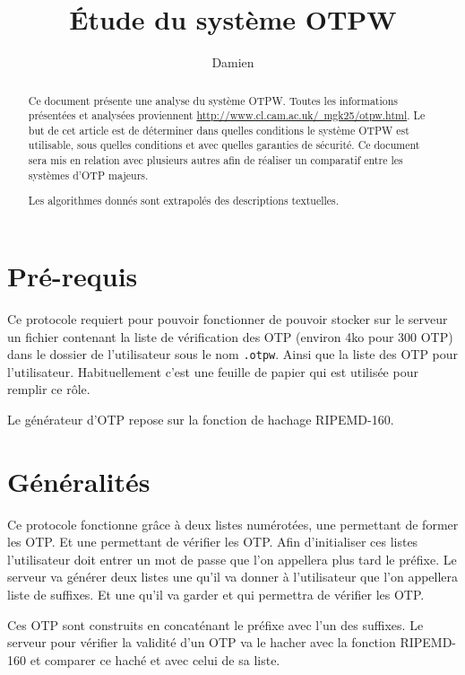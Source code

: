 \documentclass{../res/univ-projet}
\title{\'Etude du syst\`eme OTPW}
\author{Damien \bsc{PICARD}}
\begin{document}
\maketitle

\begin{abstract}
        Ce document présente une analyse du système OTPW. Toutes les
    informations présentées et analysées proviennent 
    \hyperref[de ce site]{http://www.cl.cam.ac.uk/~mgk25/otpw.html}. Le
    but de cet article est de déterminer dans quelles conditions le
    système OTPW est utilisable, sous quelles conditions et avec quelles 
    garanties de sécurité.
    Ce document sera mis en relation avec plusieurs autres afin de réaliser un
    comparatif entre les systèmes d'OTP majeurs.

    Les algorithmes donnés sont extrapolés des descriptions textuelles.
\end{abstract}
\newpage
\tableofcontents
\newpage

\section{Pré-requis}
        Ce protocole requiert pour pouvoir fonctionner de pouvoir stocker
    sur le serveur un fichier contenant la liste de vérification des OTP (environ 
    4ko pour 300 OTP) dans le dossier de l'utilisateur sous le nom \verb?.otpw?.
    Ainsi que la liste des OTP pour l'utilisateur. Habituellement
    c'est une feuille de papier qui est utilisée pour remplir ce rôle.

        Le générateur d'OTP repose sur la fonction de hachage RIPEMD-160.

\section{Généralités}
        Ce protocole fonctionne grâce à deux listes numérotées, une permettant 
    de former les OTP. Et une permettant de vérifier les OTP. Afin d'initialiser
    ces listes l'utilisateur doit entrer un mot de passe que l'on appellera plus
    tard le préfixe. Le serveur va générer deux listes une qu'il va donner à
    l'utilisateur que l'on appellera liste de suffixes. Et une qu'il va garder
    et qui permettra de vérifier les OTP.

        Ces OTP sont construits en concaténant le préfixe avec l'un des suffixes.
    Le serveur pour vérifier la validité d'un OTP va le hacher avec la fonction
    RIPEMD-160 et comparer ce haché et avec celui de sa liste.
\end{document}
